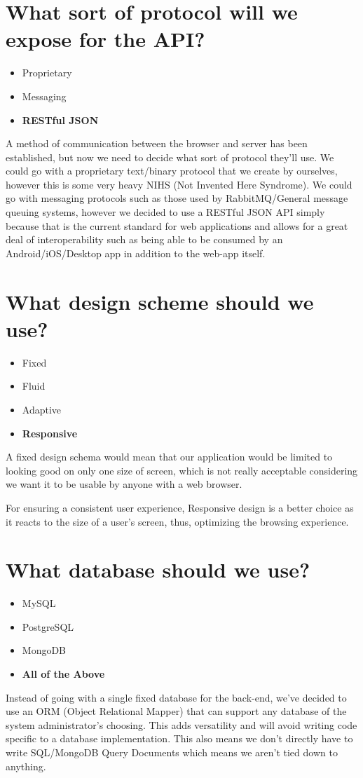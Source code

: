 \documentclass[12pt]{report}
\begin{document}
\section{What sort of protocol will we expose for the API?}
\begin{itemize}
    \item{Proprietary}
    \item{Messaging}
    \item\textbf{RESTful JSON}
\end{itemize}
A method of communication between the browser and server has been established, but now we need to decide what sort of protocol they'll use. We could go with a proprietary text/binary protocol that we create by ourselves, however this is some very heavy NIHS (Not Invented Here Syndrome). We could go with messaging protocols such as those used by RabbitMQ/General message queuing systems, however we decided to use a RESTful JSON API simply because that is the current standard for web applications and allows for a great deal of interoperability such as being able to be consumed by an Android/iOS/Desktop app in addition to the web-app itself.

\section{What design scheme should we use?}
\begin{itemize}
    \item{Fixed}
    \item{Fluid}
    \item{Adaptive}
    \item\textbf{Responsive}
\end{itemize}
A fixed design schema would mean that our application would be limited to looking good on only one size of screen, which is not really acceptable considering we want it to be usable by anyone with a web browser.

For ensuring a consistent user experience, Responsive design is a better choice as it reacts to the size of a user’s screen, thus, optimizing the browsing experience.

\section{What database should we use?}
\begin{itemize}
    \item{MySQL}
    \item{PostgreSQL}
    \item{MongoDB} 
    \item\textbf{All of the Above}
\end{itemize}
Instead of going with a single fixed database for the back-end, we've decided to use an ORM (Object Relational Mapper) that can support any database of the system administrator's choosing. This adds versatility and will avoid writing code specific to a database implementation. This also means we don't directly have to write SQL/MongoDB Query Documents which means we aren't tied down to anything.
\end{document}
